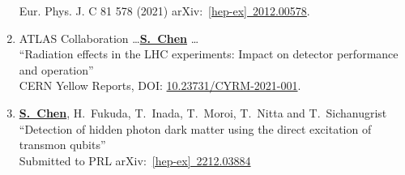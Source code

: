 \documentclass[12pt]{article}
\begin{document}
\begin{enumerate}
          Eur. Phys. J. C 81 578 (2021) arXiv:~\href{https://arxiv.org/abs/2012.00578}{[hep-ex]~2012.00578}. \label{Pub::ATLPaper_muon_Run2}
%
	\item ATLAS Collaboration \dots \underline{\textbf{S.~Chen}} \dots \\
              ``Radiation effects in the LHC experiments: Impact on detector performance and operation'' \\ 
          CERN Yellow Reports, DOI: \href{https://e-publishing.cern.ch/index.php/CYRM/issue/view/129}{10.23731/CYRM-2021-001}. \label{Pub::CERN_YR_radiation}
%
	\item \underline{\textbf{S.~Chen}}, H.~Fukuda, T.~Inada, T.~Moroi, T.~Nitta and T.~Sichanugrist \\
          ``Detection of hidden photon dark matter using the direct excitation of transmon qubits'' \\
	    Submitted to PRL  arXiv:~\href{https://arxiv.org/abs/2212.03884}{[hep-ex]~2212.03884}   \label{Pub::DMQubits1}          

\end{enumerate}
\end{document}
